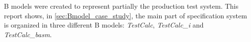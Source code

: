 



B models were created to represent partially the production test system. This
report shows, in \ref{sec:Bmodel_case_study},  the main part of specification
system is organized in three different B models: \textit{TestCalc},
\textit{TestCalc\_i} and \textit{TestCalc\_basm}.

